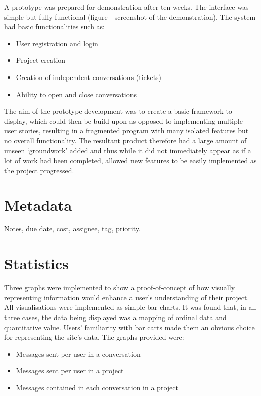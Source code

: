 \documentclass[a4paper]{l3proj}
\begin{document}
A prototype was prepared for demonstration after ten weeks. The interface was simple but fully functional (figure - screenshot of the demonstration). The system had basic functionalities such as: 

\begin{itemize}
\item User registration and login
\item Project creation
\item Creation of independent conversations (tickets)
\item Ability to open and close conversations
\end{itemize}

The aim of the prototype development was to create a basic framework to display, which could then be build upon as opposed to implementing multiple user stories, resulting in a fragmented program with many isolated features but no overall functionality.  The resultant product therefore had a large amount of unseen ‘groundwork’ added and thus while it did not immediately appear as if a lot of work had been completed, allowed new features to be easily implemented as the project progressed. 

\section{Metadata}
\label{metadata}

Notes, due date, cost, assignee, tag, priority.

\section{Statistics}
\label{statistics}

Three graphs were implemented to show a proof-of-concept of how visually representing information would enhance a user’s understanding of their project. 
All visualisations were implemented as simple bar charts. It was found that, in all three cases, the data being displayed was a mapping of ordinal data and quantitative value. Users’ familiarity with bar carts made them an obvious choice for representing the site’s data. 
The graphs provided were:

\begin{itemize}
\item Messages sent per user in a conversation
\item Messages sent per user in a project
\item Messages contained in each conversation in a project
\end{itemize}
\end{document}
